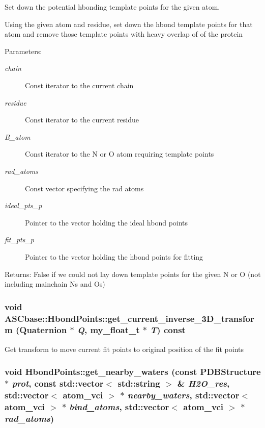Set down the potential hbonding template points for the given atom. 

Using the given atom and residue, set down the hbond template points for that atom and remove those template points with heavy overlap of of the protein

\begin{Desc}
\item[Parameters:]
\begin{description}
\item[{\em chain}]Const iterator to the current chain \item[{\em residue}]Const iterator to the current residue \item[{\em B\_\-atom}]Const iterator to the N or O atom requiring template points \item[{\em rad\_\-atoms}]Const vector specifying the rad atoms \item[{\em ideal\_\-pts\_\-p}]Pointer to the vector holding the ideal hbond points \item[{\em fit\_\-pts\_\-p}]Pointer to the vector holding the hbond points for fitting \end{description}
\end{Desc}
\begin{Desc}
\item[Returns:]False if we could not lay down template points for the given N or O (not including mainchain Ns and Os) \end{Desc}
\subsubsection{\setlength{\rightskip}{0pt plus 5cm}void ASCbase::Hbond\-Points::get\_\-current\_\-inverse\_\-3D\_\-transform (Quaternion $\ast$ {\em Q}, my\_\-float\_\-t $\ast$ {\em T}) const\hspace{0.3cm}{\tt  [inline]}}\label{classASCbase_1_1HbondPoints_315af5cac9bd9bbd51d52bd2539ed075}


Get transform to move current fit points to original position of the fit points 
\subsubsection{\setlength{\rightskip}{0pt plus 5cm}void Hbond\-Points::get\_\-nearby\_\-waters (const \bf{PDBStructure} $\ast$ {\em prot}, const std::vector$<$ std::string $>$ \& {\em H2O\_\-res}, std::vector$<$ atom\_\-vci $>$ $\ast$ {\em nearby\_\-waters}, std::vector$<$ atom\_\-vci $>$ $\ast$ {\em bind\_\-atoms}, std::vector$<$ atom\_\-vci $>$ $\ast$ {\em rad\_\-atoms})\hspace{0.3cm}{\tt  [private]}}\label{classASCbase_1_1HbondPoints_ff5ef9470438e55c45d421cafde76651}



